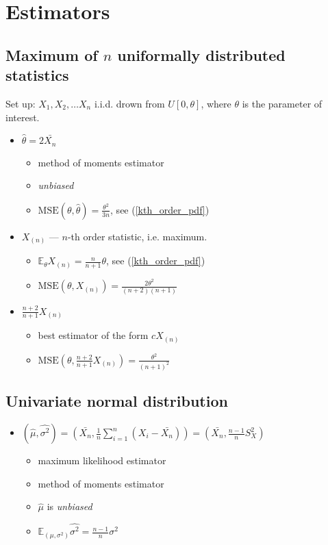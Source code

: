 \documentclass[12pt]{article}
\begin{document}
\section{Estimators}

\subsection{Maximum of $n$ uniformally distributed statistics}

Set up: $X_1, X_2,\ldots X_n$ i.i.d. drown from $U[0, \theta]$, where $\theta$ is the parameter of interest.

\begin{itemize}
	\item $\hat\theta = 2\bar{X_n}$
	\begin{itemize}
		\item method of moments estimator
		\item \emph{unbiased}
		\item $\text{MSE}(\theta, \hat\theta) = \frac {\theta^2}{3n}$, see (\ref{kth_order_pdf})
	\end{itemize}
	\item $X_{(n)}$ --- $n$-th order statistic, i.e. maximum.
	\begin{itemize}
		\item $\mathbb{E}_\theta X_{(n)} = \frac{n}{n+1}\theta$, see (\ref{kth_order_pdf})
		\item $\text{MSE}(\theta, X_{(n)}) = \frac {2\theta^2}{(n+2)(n+1)}$
	\end{itemize}
	\item $\frac{n+2}{n+1}X_{(n)}$
	\begin{itemize}
		\item best estimator of the form $cX_{(n)}$
		\item $\text{MSE}(\theta, \frac{n+2}{n+1}X_{(n)}) = \frac {\theta^2}{(n+1)^2}$
	\end{itemize}
\end{itemize}

\subsection{Univariate normal distribution}

\begin{itemize}
	\item $\displaystyle{(\hat\mu, \hat{\sigma^2}) = \left(\bar{X_n}, \frac 1 n \sum_{i=1}^n (X_i - \bar{X_n}) \right) = \left(\bar{X_n}, \frac {n-1} n S_X^2 \right)}$
	\begin{itemize}
		\item maximum likelihood estimator
		\item method of moments estimator
		\item $\hat\mu$ is \emph{unbiased}
		\item $\mathbb{E}_{(\mu,\sigma^2)}\hat{\sigma^2} = \frac {n-1} n \sigma^2$

	\end{itemize}

\end{itemize}
\end{document}
